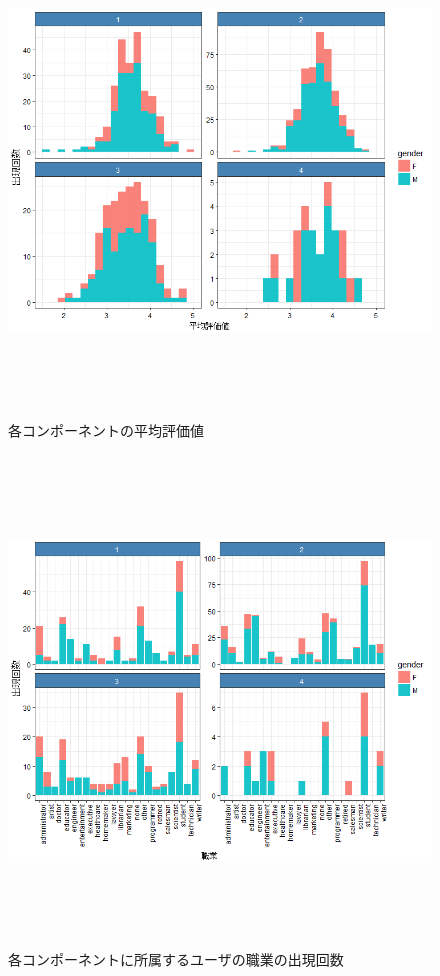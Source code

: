 \documentclass[a4j,12pt]{jarticle}
\begin{document}
\begin{figure}[tbp]
\begin{center}
\includegraphics[clip,height= 130mm]{data/rating_average.png}
\end{center}
\caption{各コンポーネントの平均評価値}
\label{rating_average}
\end{figure}

\begin{figure}[tbp]
\begin{center}
\includegraphics[clip,height= 130mm]{data/job_count.png}
\end{center}
\caption{各コンポーネントに所属するユーザの職業の出現回数}
\label{job_count}
\end{figure}
\end{document}

